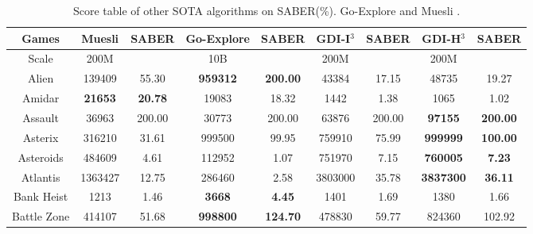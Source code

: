 \documentclass[nohyperref]{article}
\theoremstyle{plain}
\begin{document}
\begin{table}[!hb]
\footnotesize
\begin{center}
\caption{Score table of other SOTA  algorithms on SABER(\%). Go-Explore \citep{goexplore} and Muesli \citep{muesli}.}
\label{tab: Score table of other SOTA  algorithms on SABER.}
\setlength{\tabcolsep}{1.0pt}
\begin{tabular}{| c | c c |  c c| c c| c c|}
\hline
 Games           & Muesli              & SABER          & Go-Explore              & SABER                     & GDI-I$^3$ & SABER        & GDI-H$^3$ & SABER         \\
\hline
Scale            & 200M           &           & 10B                     &                             & 200M      &        & 200M      &           \\
\hline    
 Alien           &139409          &55.30               &\textbf{959312}       &\textbf{200.00}                & 43384             &17.15     &48735             &19.27         \\
 Amidar          &\textbf{21653}  &\textbf{20.78}      &19083                 &18.32                          & 1442              &1.38      &1065              &1.02          \\
 Assault         &36963           &200.00              &30773                 &200.00                         & 63876             &200.00  &\textbf{97155}&\textbf{200.00}        \\
 Asterix         &316210          &31.61               &999500       &99.95                 & 759910            &75.99      &\textbf{999999}            &\textbf{100.00}     \\
 Asteroids       &484609          &4.61                &112952                &1.07                           & 751970     &7.15&\textbf{760005}            &\textbf{7.23}           \\
 Atlantis        &1363427         &12.75               &286460                &2.58                           & 3803000    &35.78&\textbf{3837300}           &\textbf{36.11}          \\
 Bank Heist      &1213            &1.46                &\textbf{3668}         &\textbf{4.45  }                & 1401              &1.69        &1380              &1.66      \\
 Battle Zone     &414107          &51.68               &\textbf{998800}       &\textbf{124.70}                & 478830            &59.77       &824360            &102.92      \\

\end{tabular}
\end{center}
\end{table}
\end{document}
